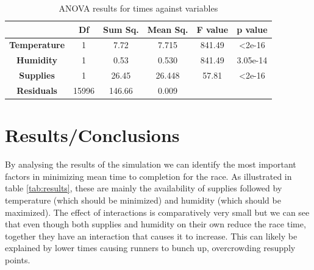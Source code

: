 \documentclass[conference]{IEEEtran}
\begin{document}
\begin{enumerate}
    \begin{table}[]
    \caption{ANOVA results for times against variables}
    \begin{center}
    \begin{tabular}{|c|c|c|c|c|c|}
    \hline
    & \textbf{Df} & \textbf{Sum Sq. } & \textbf{Mean Sq.} & \textbf{F value} & \textbf{p value} \\
    \hline
    \textbf{Temperature} & 1 & 7.72 & 7.715 & 841.49 & \textless 2e-16 \\
    \hline
    \textbf{Humidity} & 1 & 0.53 & 0.530 & 841.49  & 3.05e-14\\
    \hline
    \textbf{Supplies} & 1 & 26.45 & 26.448 & 57.81 & \textless 2e-16\\
    \hline
    \textbf{Residuals} & 15996 & 146.66 & 0.009 & & \\
    \hline
    \end{tabular}
    \label{tab:anova_results}
    \end{center}
    \end{table}

\end{enumerate}

\section{Results/Conclusions}

By analysing the results of the simulation we can identify the most important factors in minimizing mean time to completion for the race. As illustrated in table \ref{tab:results}, these are mainly the availability of supplies followed by temperature (which should be minimized) and humidity (which should be maximized). The effect of interactions is comparatively very small but we can see that even though both supplies and humidity on their own reduce the race time, together they have an interaction that causes it to increase. This can likely be explained by lower times causing runners to bunch up, overcrowding resupply points.
\end{document}
